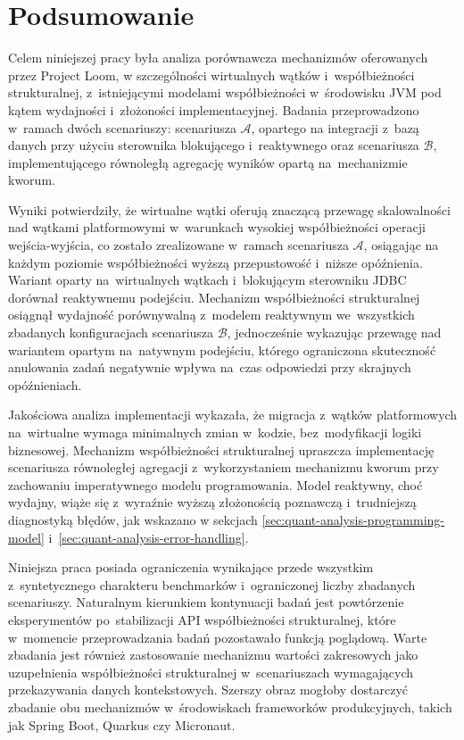 \chapter{Podsumowanie}

Celem niniejszej pracy była analiza porównawcza mechanizmów oferowanych przez Project Loom, w szczególności wirtualnych wątków i~współbieżności strukturalnej, z~istniejącymi modelami współbieżności w~środowisku JVM pod kątem wydajności i~złożoności implementacyjnej. Badania przeprowadzono w~ramach dwóch scenariuszy: scenariusza $\mathcal{A}$, opartego na integracji z~bazą danych przy użyciu sterownika blokującego i~reaktywnego oraz scenariusza $\mathcal{B}$, implementującego równoległą agregację wyników opartą na~mechanizmie kworum.

Wyniki potwierdziły, że wirtualne wątki oferują znaczącą przewagę skalowalności nad wątkami platformowymi w~warunkach wysokiej współbieżności operacji wejścia-wyjścia, 
co zostało zrealizowane w~ramach scenariusza $\mathcal{A}$,
osiągając na każdym poziomie współbieżności wyższą przepustowość i~niższe opóźnienia. Wariant oparty na~wirtualnych wątkach i~blokującym sterowniku JDBC dorównał reaktywnemu podejściu. Mechanizm współbieżności strukturalnej osiągnął wydajność porównywalną z~modelem reaktywnym we~wszystkich zbadanych konfiguracjach scenariusza $\mathcal{B}$, jednocześnie wykazując przewagę nad wariantem opartym na~natywnym podejściu, którego ograniczona skuteczność anulowania zadań negatywnie wpływa na~czas odpowiedzi przy skrajnych opóźnieniach.

Jakościowa analiza implementacji wykazała, że migracja z~wątków platformowych na~wirtualne wymaga minimalnych zmian w~kodzie, bez~modyfikacji logiki biznesowej. Mechanizm współbieżności strukturalnej upraszcza implementację scenariusza równoległej agregacji z~wykorzystaniem mechanizmu kworum przy zachowaniu imperatywnego modelu programowania. Model reaktywny, choć wydajny, wiąże się z~wyraźnie wyższą złożonością poznawczą i~trudniejszą diagnostyką błędów, jak wskazano w sekcjach \ref{sec:quant-analysis-programming-model} i~\ref{sec:quant-analysis-error-handling}.

Niniejsza praca posiada ograniczenia wynikające przede wszystkim z~syntetycznego charakteru benchmarków i~ograniczonej liczby zbadanych scenariuszy. Naturalnym kierunkiem kontynuacji badań jest powtórzenie eksperymentów po~stabilizacji API współbieżności strukturalnej, które w~momencie przeprowadzania badań pozostawało funkcją poglądową. Warte zbadania jest również zastosowanie mechanizmu wartości zakresowych jako uzupełnienia współbieżności strukturalnej w~scenariuszach wymagających przekazywania danych kontekstowych. Szerszy obraz mogłoby dostarczyć zbadanie obu mechanizmów w~środowiskach frameworków produkcyjnych, takich jak Spring Boot, Quarkus czy Micronaut.

